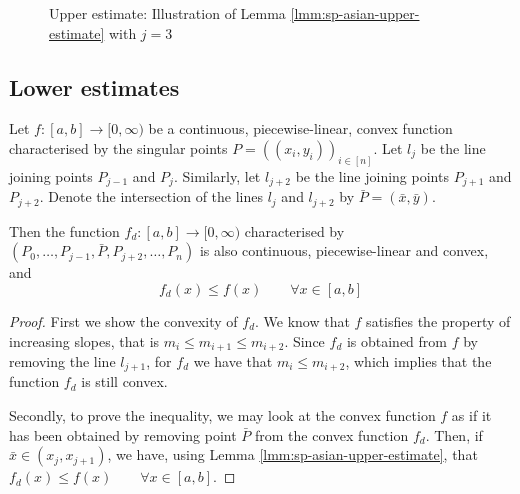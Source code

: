 \begin{figure}
	
	\caption{Upper estimate: Illustration of Lemma \ref{lmm:sp-asian-upper-estimate} with $ j = 3 $}
	\label{fig:upper-estimate}
\end{figure}



\subsection{Lower estimates}
\label{subsec:sp-asian-lower-estimates}

\begin{lmm}
	\label{lmm:sp-asian-lower-estimate}
	Let $ f:[a,b] \to [0, \infty) $ be a continuous, piecewise-linear, convex function characterised by the singular points $ P = ( (x_i, y_i) )_{i \in [n]} $. Let $ l_{j} $ be the line joining points $ P_{j-1} $ and $ P_{j} $. Similarly, let $ l_{j+2} $ be the line joining points $ P_{j+1} $ and $ P_{j+2} $. Denote the intersection of the lines $ l_{j} $ and $ l_{j+2} $ by $ \bar{P} = ( \bar{x}, \bar{y} ) $.
	
	Then the function $ f_d: [a,b] \to [0, \infty) $ characterised by $ (P_0, \dots, P_{j-1}, \bar{P}, P_{j+2}, \dots, P_n) $ is also continuous, piecewise-linear and convex, and
	\begin{equation}
		f_d(x) \le f(x) \qquad \forall x \in [a,b]
	\end{equation}
\end{lmm}

\begin{proof}
	First we show the convexity of $f_d$. We know that $f$ satisfies the property of increasing slopes, that is $ m_{i} \le m_{i+1} \le m_{i+2} $. Since $f_d$ is obtained from $f$ by removing the line $l_{j+1}$, for $f_d$ we have that $ m_{i} \le m_{i+2} $, which implies that the function $f_d$ is still convex.
	
	Secondly, to prove the inequality, we may look at the convex function $f$ as if it has been obtained by removing point $ \bar{P} $ from the convex function $f_d$. Then, if $ \bar{x} \in ( x_{j} , x_{j+1} ) $, we have, using Lemma \ref{lmm:sp-asian-upper-estimate}, that $ f_d(x) \le f(x) \qquad \forall x \in [a,b] $.
\end{proof}

